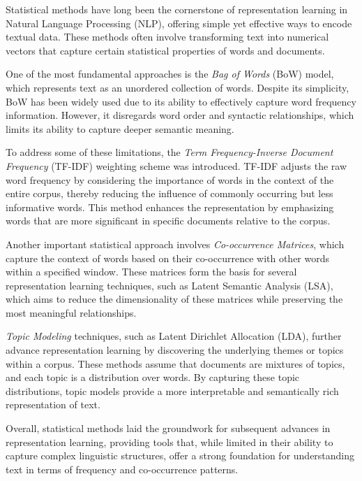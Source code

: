 Statistical methods have long been the cornerstone of representation learning in Natural Language Processing (NLP), offering simple yet effective ways to encode textual data. These methods often involve transforming text into numerical vectors that capture certain statistical properties of words and documents.

One of the most fundamental approaches is the \textit{Bag of Words} (BoW) model, which represents text as an unordered collection of words. Despite its simplicity, BoW has been widely used due to its ability to effectively capture word frequency information. However, it disregards word order and syntactic relationships, which limits its ability to capture deeper semantic meaning.

To address some of these limitations, the \textit{Term Frequency-Inverse Document Frequency} (TF-IDF) weighting scheme was introduced. TF-IDF adjusts the raw word frequency by considering the importance of words in the context of the entire corpus, thereby reducing the influence of commonly occurring but less informative words. This method enhances the representation by emphasizing words that are more significant in specific documents relative to the corpus.

Another important statistical approach involves \textit{Co-occurrence Matrices}, which capture the context of words based on their co-occurrence with other words within a specified window. These matrices form the basis for several representation learning techniques, such as Latent Semantic Analysis (LSA), which aims to reduce the dimensionality of these matrices while preserving the most meaningful relationships.

\textit{Topic Modeling} techniques, such as Latent Dirichlet Allocation (LDA), further advance representation learning by discovering the underlying themes or topics within a corpus. These methods assume that documents are mixtures of topics, and each topic is a distribution over words. By capturing these topic distributions, topic models provide a more interpretable and semantically rich representation of text.

Overall, statistical methods laid the groundwork for subsequent advances in representation learning, providing tools that, while limited in their ability to capture complex linguistic structures, offer a strong foundation for understanding text in terms of frequency and co-occurrence patterns.


